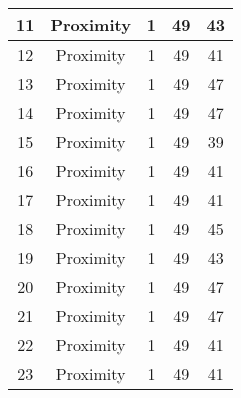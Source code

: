 \documentclass[results.tex]{subfiles}
\begin{document}
\begin{center}
\begin{tabular}{| c || c | c | c | c |}
            \hline
            11                      & Proximity                    & 1                      & 49                      & 43                   \\
            \hline
            12                      & Proximity                    & 1                      & 49                      & 41                   \\
            \hline
            13                      & Proximity                    & 1                      & 49                      & 47                   \\
            \hline
            14                      & Proximity                    & 1                      & 49                      & 47                   \\
            \hline
            15                      & Proximity                    & 1                      & 49                      & 39                   \\
            \hline
            16                      & Proximity                    & 1                      & 49                      & 41                   \\
            \hline
            17                      & Proximity                    & 1                      & 49                      & 41                   \\
            \hline
            18                      & Proximity                    & 1                      & 49                      & 45                   \\
            \hline
            19                      & Proximity                    & 1                      & 49                      & 43                   \\
            \hline
            20                      & Proximity                    & 1                      & 49                      & 47                   \\
            \hline
            21                      & Proximity                    & 1                      & 49                      & 47                   \\
            \hline
            22                      & Proximity                    & 1                      & 49                      & 41                   \\
            \hline
            23                      & Proximity                    & 1                      & 49                      & 41                   \\

\end{tabular}
\end{center}
\end{document}
